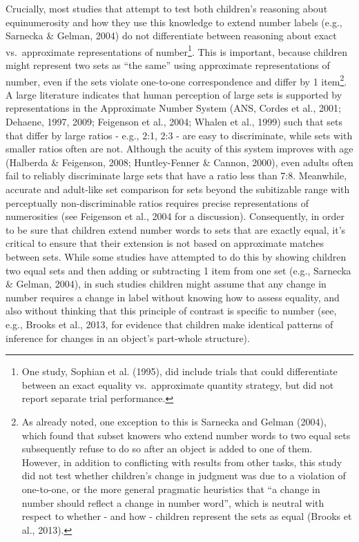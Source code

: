 \documentclass[
  man,floatsintext]{apa7}
\begin{document}
Crucially, most studies that attempt to test both children's reasoning about equinumerosity and how they use this knowledge to extend number labels (e.g., Sarnecka \& Gelman, 2004) do not differentiate between reasoning about exact vs.~approximate representations of number\footnote{One study, Sophian et al. (1995), did include trials that could differentiate between an exact equality vs.~approximate quantity strategy, but did not report separate trial performance.}. This is important, because children might represent two sets as ``the same'' using approximate representations of number, even if the sets violate one-to-one correspondence and differ by 1 item\footnote{As already noted, one exception to this is Sarnecka and Gelman (2004), which found that subset knowers who extend number words to two equal sets subsequently refuse to do so after an object is added to one of them. However, in addition to conflicting with results from other tasks, this study did not test whether children's change in judgment was due to a violation of one-to-one, or the more general pragmatic heuristics that ``a change in number should reflect a change in number word'', which is neutral with respect to whether - and how - children represent the sets as equal (Brooks et al., 2013).}. A large literature indicates that human perception of large sets is supported by representations in the Approximate Number System (ANS, Cordes et al., 2001; Dehaene, 1997, 2009; Feigenson et al., 2004; Whalen et al., 1999) such that sets that differ by large ratios - e.g., 2:1, 2:3 - are easy to discriminate, while sets with smaller ratios often are not. Although the acuity of this system improves with age (Halberda \& Feigenson, 2008; Huntley-Fenner \& Cannon, 2000), even adults often fail to reliably discriminate large sets that have a ratio less than 7:8. Meanwhile, accurate and adult-like set comparison for sets beyond the subitizable range with perceptually non-discriminable ratios requires precise representations of numerosities (see Feigenson et al., 2004 for a discussion). Consequently, in order to be sure that children extend number words to sets that are exactly equal, it's critical to ensure that their extension is not based on approximate matches between sets. While some studies have attempted to do this by showing children two equal sets and then adding or subtracting 1 item from one set (e.g., Sarnecka \& Gelman, 2004), in such studies children might assume that any change in number requires a change in label without knowing how to assess equality, and also without thinking that this principle of contrast is specific to number (see, e.g., Brooks et al., 2013, for evidence that children make identical patterns of inference for changes in an object's part-whole structure).
\end{document}

